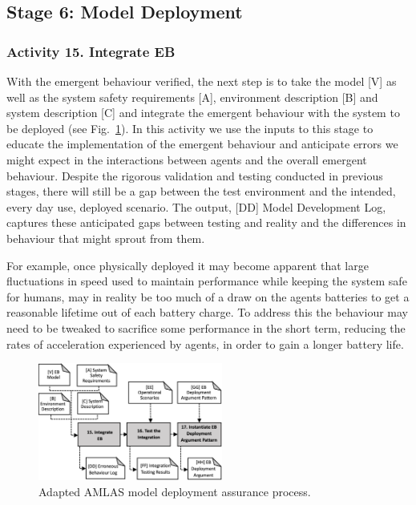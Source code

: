 \documentclass[lettersize,journal]{IEEEtran}
\begin{document}
\subsection{Stage 6: Model Deployment} \label{framework-stage6}

\subsubsection*{Activity 15. Integrate EB}

With the emergent behaviour verified, the next step is to take the model [V] as well as the system safety requirements [A], environment description [B] and system description [C] and integrate the emergent behaviour with the system to be deployed (see Fig.~\ref{amlas-a-stage6}). In this activity we use the inputs to this stage to educate the implementation of the emergent behaviour and anticipate errors we might expect in the interactions between agents and the overall emergent behaviour. Despite the rigorous validation and testing conducted in previous stages, there will still be a gap between the test environment and the intended, every day use, deployed scenario. The output, [DD] Model Development Log, captures these anticipated gaps between testing and reality and the differences in behaviour that might sprout from them.

For example, once physically deployed it may become apparent that large fluctuations in speed used to maintain performance while keeping the system safe for humans, may in reality be too much of a draw on the agents batteries to get a reasonable lifetime out of each battery charge. To address this the behaviour may need to be tweaked to sacrifice some performance in the short term, reducing the rates of acceleration experienced by agents, in order to gain a longer battery life.
\begin{figure}[!t]
	\centering
	\includegraphics[width=0.54\textwidth]{figures/amlas-a-stage6_v2.png}%
	\caption{Adapted AMLAS model deployment assurance process.}
	\label{amlas-a-stage6}
\end{figure}
\end{document}
